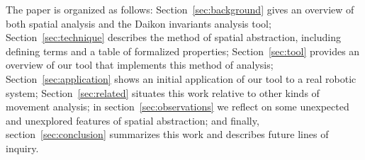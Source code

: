 The paper is organized as follows:
Section~\ref{sec:background} gives an overview of both spatial analysis and the Daikon invariants analysis tool;
Section~\ref{sec:technique} describes the method of spatial abstraction, including defining terms and a table of formalized properties;
Section~\ref{sec:tool} provides an overview of our tool that implements this method of analysis;
Section~\ref{sec:application} shows an initial application of our tool to a real robotic system;
Section~\ref{sec:related} situates this work relative to other kinds of movement analysis;
in section~\ref{sec:observations} we reflect on some unexpected and unexplored features of spatial abstraction;
and finally, section~\ref{sec:conclusion} summarizes this work and describes future lines of inquiry. 




